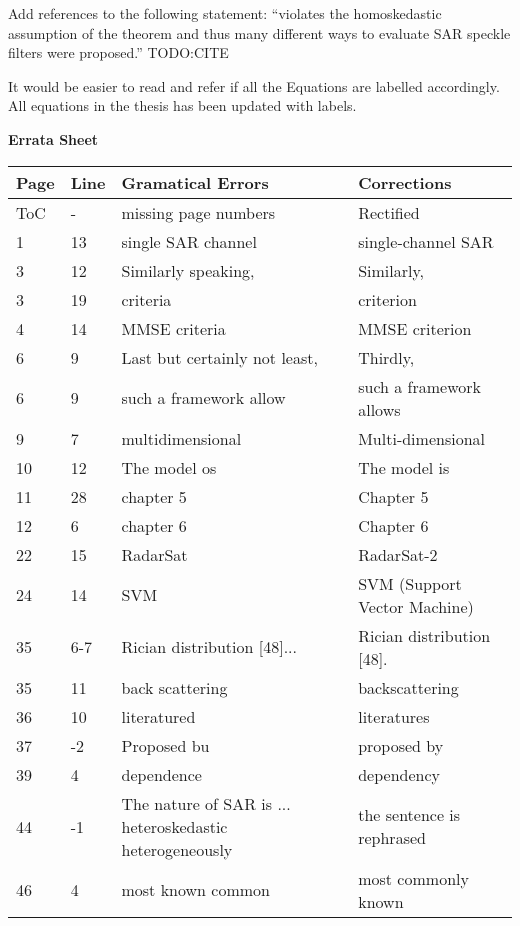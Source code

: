 \replyToComment
    {Add references to the following statement: ``violates the homoskedastic assumption of the theorem and thus many different ways to evaluate SAR speckle filters were proposed.''}
    {TODO:CITE}

\replyToComment
    {It would be easier to read and refer if all the Equations are labelled accordingly.}
    {All equations in the thesis has been updated with labels.}


\textbf{Errata Sheet}
    
\noindent
\begin{longtable}[c]{p{}|p{}|p{}|p{}}
\textbf{Page} & \textbf{Line} & \textbf{Gramatical Errors} & \textbf{Corrections} \\
 \hline
 \endhead
ToC & - & missing page numbers & Rectified \\
1 & 13 & single SAR channel & single-channel SAR \\ 
3 & 12 & Similarly speaking, & Similarly, \\
3 & 19 & criteria & criterion \\ 
4 & 14 & MMSE criteria & MMSE criterion \\
6 & 9 & Last but certainly not least, & Thirdly, \\ 
6 & 9 & such a framework allow & such a framework allows \\
9 & 7 & multidimensional & Multi-dimensional \\
10 & 12 & The model os & The model is \\
11 & 28 & chapter 5 & Chapter 5 \\
12 & 6 & chapter 6 & Chapter 6 \\
22 & 15 & RadarSat & RadarSat-2 \\
24 & 14 & SVM & SVM (Support Vector Machine) \\
35 & 6-7 & Rician distribution [48]... & Rician distribution [48]. \\
35 & 11 & back scattering & backscattering \\
36 & 10 & literatured & literatures \\
37 & -2 & Proposed bu & proposed by \\
39 & 4 & dependence & dependency \\
44 & -1 & The nature of SAR is ... heteroskedastic heterogeneously & the sentence is rephrased \\
46 & 4 & most known common & most commonly known \\

\end{longtable}
